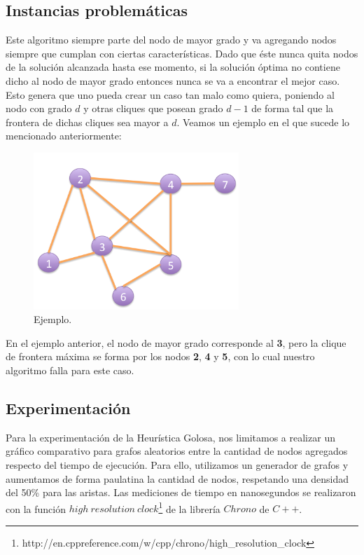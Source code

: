 \subsection{Instancias problemáticas}
Este algoritmo siempre parte del nodo de mayor grado y va agregando nodos siempre que cumplan con ciertas características. Dado que éste nunca quita nodos de la solución alcanzada hasta ese momento, si la solución óptima no contiene dicho al nodo de mayor grado entonces nunca se va a encontrar el mejor caso. Esto genera que uno pueda crear un caso tan malo como quiera, poniendo al nodo con grado $d$ y otras cliques que posean grado $d-1$ de forma tal que la frontera de dichas cliques sea mayor a $d$. Veamos un ejemplo en el que sucede lo mencionado anteriormente:
\begin{figure}[H] %
\begin{center}
\includegraphics[width=220pt]{../imgs/ejemploGoloso.jpg}
\caption{Ejemplo.}
\end{center}
\end{figure}
En el ejemplo anterior, el nodo de mayor grado corresponde al \textbf{3}, pero la clique de frontera máxima se forma por los nodos \textbf{2}, \textbf{4} y \textbf{5}, con lo cual nuestro algoritmo falla para este caso.
 
\subsection{Experimentación}
Para la experimentación de la Heurística Golosa, nos limitamos a realizar un gráfico comparativo para grafos aleatorios entre la cantidad de nodos agregados respecto del tiempo de ejecución. Para ello, utilizamos un generador de grafos y aumentamos de forma paulatina la cantidad de nodos, respetando una densidad del 50\% para las aristas.\newline
Las mediciones de tiempo en nanosegundos se realizaron con la función $high\ resolution\ clock$\footnote{http://en.cppreference.com/w/cpp/chrono/high\_resolution\_clock} de la librería $Chrono$ de $C++$. 

